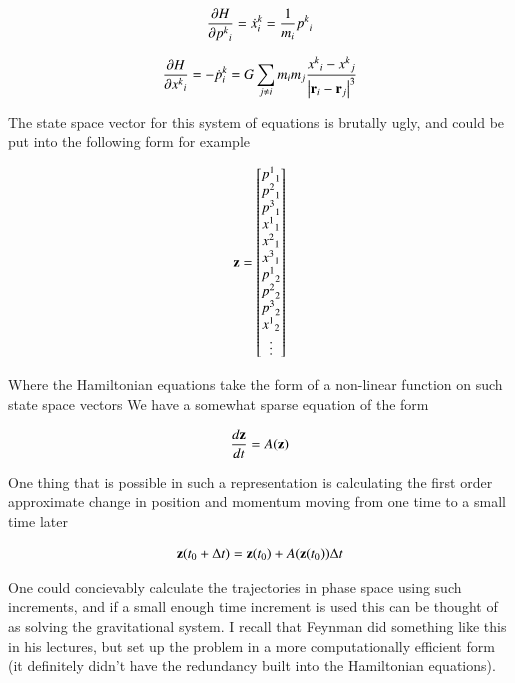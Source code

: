 \begin{align}\label{eqn:hamiltonian:moo10}
\PD{{p^k}_i}{H} = {\dot{x}^k}_i = \inv{m_i} {p^k}_i 
\end{align}

\begin{align}\label{eqn:hamiltonian:moo11}
\PD{{x^k}_i}{H} = -{\dot{p}^k}_i = G \sum_{j \ne i} m_i m_j \frac{{x^k}_i -{x^k}_j}{\Abs{\Br_i - \Br_j}^3}
\end{align}

The state space vector for this system of equations is brutally ugly, and could be put into the following form for example

\begin{align}\label{eqn:hamiltonian:moo12}
\Bz =
\begin{bmatrix}
{p^1}_1 \\
{p^2}_1 \\
{p^3}_1 \\
{x^1}_1 \\
{x^2}_1 \\
{x^3}_1 \\
{p^1}_2 \\
{p^2}_2 \\
{p^3}_2 \\
{x^1}_2 \\
\vdots \\
\end{bmatrix}
\end{align}

Where the Hamiltonian equations take the form of a non-linear function on such state space vectors
We have a somewhat sparse equation of the form

\begin{align}\label{eqn:hamiltonian:moo13}
\frac{d\Bz}{dt} = A(\Bz)
\end{align}

One thing that is possible in such a representation is calculating the first order approximate change in position and momentum moving from one time to a small time later

\begin{align}\label{eqn:hamiltonian:moo14}
\Bz(t_0 + \Delta t) = \Bz(t_0) + A(\Bz(t_0)) \Delta t
\end{align}

One could concievably calculate the trajectories in phase space using such increments, and if a small enough time increment is used this can be thought of as solving the gravitational system.  I recall that Feynman did something like this in his lectures, but set up the problem in a more computationally efficient form (it definitely didn't have the redundancy built into the Hamiltonian equations).

